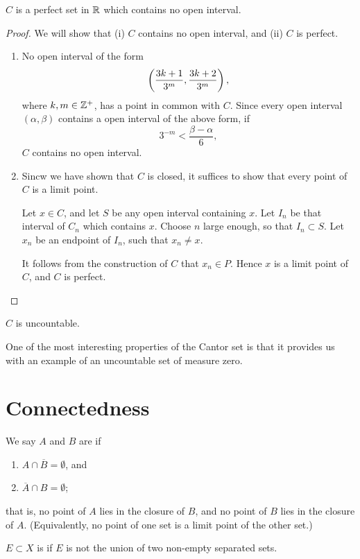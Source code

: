 \begin{proposition}
$C$ is a perfect set in $\mathbb R$ which contains no open interval.
\end{proposition}

\begin{proof}
We will show that (i) $C$ contains no open interval, and (ii) $C$ is perfect.
\begin{enumerate}[label=(\roman*)]
\item No open interval of the form
\[\left(\frac{3k+1}{3^m},\frac{3k+2}{3^m}\right),\]
where $k,m\in\mathbb Z^+$, has a point in common with $C$. Since every open interval $(\alpha,\beta)$ contains a open interval of the above form, if
\[3^{-m}<\frac{\beta-\alpha}{6},\]
$C$ contains no open interval.

\item Sincw we have shown that $C$ is closed, it suffices to show that every point of $C$ is a limit point.

Let $x\in C$, and let $S$ be any open interval containing $x$. Let $I_n$ be that interval of $C_n$ which contains $x$. Choose $n$ large enough, so that $I_n\subset S$. Let $x_n$ be an endpoint of $I_n$, such that $x_n\neq x$.

It follows from the construction of $C$ that $x_n\in P$. Hence $x$ is a limit point of $C$, and $C$ is perfect.
\end{enumerate}
\end{proof}

\begin{corollary}
$C$ is uncountable.
\end{corollary}

One of the most interesting properties of the Cantor set is that it provides us with an example of an uncountable set of measure zero.
\pagebreak

\section{Connectedness}
\begin{definition}[Connectedness]
We say $A$ and $B$ are  if
\begin{enumerate}[label=(\roman*)]
\item $A\cap\overline{B}=\emptyset$, and
\item $\overline{A}\cap B=\emptyset$;
\end{enumerate}
that is, no point of $A$ lies in the closure of $B$, and no point of $B$ lies in the closure of $A$. (Equivalently, no point of one set is a limit point of the other set.)

$E\subset X$ is  if $E$ is not the union of two non-empty separated sets. 
\end{definition}

